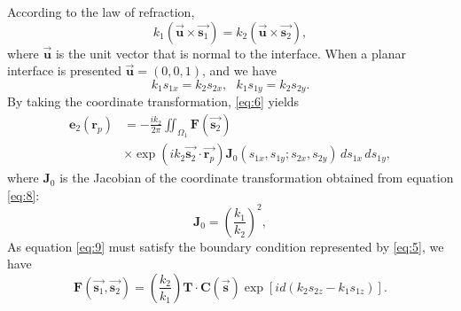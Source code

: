 \documentclass[9pt,twocolumn,twoside]{osajnl}
\begin{document}
According to the law of refraction,
\begin{equation}\label{eq:7}
	k_1(\vec{\textbf{u}}\times\vec{\textbf{s}_1})=k_2(\vec{\textbf{u}}\times\vec{\textbf{s}_2}),
\end{equation}
where $\vec{\textbf{u}}$ is the unit vector that is normal to the interface. When a planar interface is presented $\vec{\textbf{u}}=(0,0,1)$, and we have
\begin{equation}\label{eq:8}
	k_1s_{1x}=k_2s_{2x},\,\,\,\,
	k_1s_{1y}=k_2s_{2y}.
\end{equation} 
By taking the coordinate transformation, \eqref{eq:6} yields
\begin{equation}\label{eq:9}
	\begin{aligned}
		\mathbf{e}_2(\mathbf{r}_p)&=-\frac{ik_2}{2\pi}\iint_{\Omega_1}\mathbf{F}(\vec{\mathbf{s}_2})\\
		&\times\exp(ik_2\vec{\mathbf{s}_2}\cdot\vec{\mathbf{r}_p})\mathbf{J}_0(s_{1x},s_{1y};s_{2x},s_{2y})\,ds_{1x}\,ds_{1y},		
	\end{aligned}
\end{equation}
where $\mathbf{J}_0$ is the Jacobian of the coordinate transformation obtained from equation \eqref{eq:8}:
\begin{equation}\label{eq:10}
	\mathbf{J}_0=\left(\frac{k_1}{k_2}\right)^2,
\end{equation}
As equation \eqref{eq:9} must satisfy the boundary condition represented by \eqref{eq:5}, we have
\begin{equation}\label{eq:11}
	\mathbf{F}(\vec{\mathbf{s}_1},\vec{\mathbf{s}_2})=(\frac{k_2}{k_1})\mathbf{T}\cdot\mathbf{C}(\vec{\mathbf{s}})\exp[id(k_2s_{2z}-k_1s_{1z})].
\end{equation}
\end{document}
